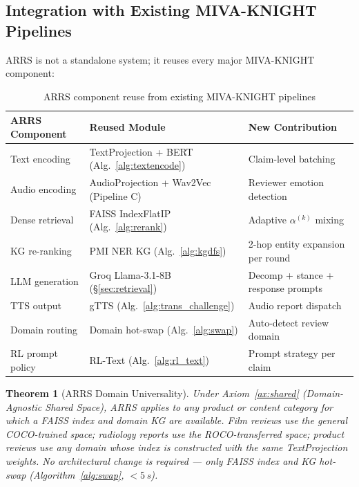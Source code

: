 \documentclass[12pt,a4paper]{article}
\theoremstyle{definition}
\theoremstyle{plain}
\newtheorem{theorem}{Theorem}[section]
\theoremstyle{remark}
\begin{document}
\subsection{Integration with Existing MIVA-KNIGHT Pipelines}
\label{sec:arrs_integration}

ARRS is not a standalone system; it reuses every major MIVA-KNIGHT component:

\begin{table}[H]
\centering
\caption{ARRS component reuse from existing MIVA-KNIGHT pipelines}
\renewcommand{\arraystretch}{1.2}
\begin{tabular}{p{3.8cm}p{4.5cm}p{5.0cm}}
\toprule
\textbf{ARRS Component} & \textbf{Reused Module} & \textbf{New Contribution} \\
\midrule
Text encoding & TextProjection + BERT (Alg.~\ref{alg:textencode}) & Claim-level batching \\
Audio encoding & AudioProjection + Wav2Vec (Pipeline C) & Reviewer emotion detection \\
Dense retrieval & FAISS IndexFlatIP (Alg.~\ref{alg:rerank}) & Adaptive $\alpha^{(k)}$ mixing \\
KG re-ranking & PMI NER KG (Alg.~\ref{alg:kgdfs}) & 2-hop entity expansion per round \\
LLM generation & Groq Llama-3.1-8B (\S\ref{sec:retrieval}) & Decomp + stance + response prompts \\
TTS output & gTTS (Alg.~\ref{alg:trans_challenge}) & Audio report dispatch \\
Domain routing & Domain hot-swap (Alg.~\ref{alg:swap}) & Auto-detect review domain \\
RL prompt policy & RL-Text (Alg.~\ref{alg:rl_text}) & Prompt strategy per claim \\
\bottomrule
\end{tabular}
\end{table}

\begin{theorem}[ARRS Domain Universality]
\label{thm:arrs_domain}
Under Axiom~\ref{ax:shared} (Domain-Agnostic Shared Space), ARRS applies 
to \emph{any} product or content category for which a FAISS index and 
domain KG are available. Film reviews use the general COCO-trained space; 
radiology reports use the ROCO-transferred space; product reviews use 
any domain whose index is constructed with the same TextProjection weights. 
No architectural change is required --- only FAISS index and KG hot-swap 
(Algorithm~\ref{alg:swap}, $< 5$\,s).
\end{theorem}
\end{document}
